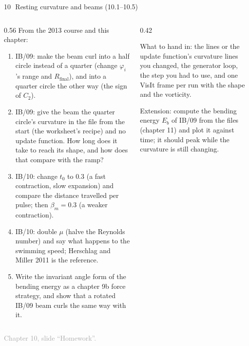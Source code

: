 \documentclass[aspectratio=169,11pt]{beamer}
\newcommand{\sourcecredit}[1]{\vfill\begin{flushright}\tiny\textcolor{DarkGray}{#1}\end{flushright}}
\begin{document}
\begin{frame}{10\,\textbullet\ Resting curvature and beams (10.1--10.5)}
\label{fr:c10x1}
\begin{columns}[T,onlytextwidth]
\begin{column}{0.56\textwidth}
\scriptsize From the 2013 course and this chapter:
\begin{enumerate}
  \item[10.1] IB/09: make the beam curl into a half circle instead of a quarter (change $\varphi_i$'s range and $R_{\mathrm{final}}$), and into a quarter circle the other way (the sign of $C_2$).
  \item[10.2] IB/09: give the beam the quarter circle's curvature in the  file from the start (the worksheet's recipe) and no update function. How long does it take to reach its shape, and how does that compare with the ramp?
  \item[10.3] IB/10: change $t_0$ to $0.3$ (a fast contraction, slow expansion) and compare the distance travelled per pulse; then $\beta_m = 0.3$ (a weaker contraction).
  \item[10.4] IB/10: double $\mu$ (halve the Reynolds number) and say what happens to the swimming speed; Herschlag and Miller 2011 is the reference.
  \item[10.5] Write the invariant angle form of the bending energy as a chapter 9b force strategy, and show that a rotated IB/09 beam curls the same way with it.
\end{enumerate}
\end{column}
\begin{column}{0.42\textwidth}
\begin{punchbox}
\scriptsize What to hand in: the  lines or the update function's curvature lines you changed, the generator loop, the step you had to use, and one VisIt frame per run with the shape and the vorticity.
\end{punchbox}
\scriptsize {} Extension: compute the bending energy $E_b$ of IB/09 from the  files (chapter 11) and plot it against time; it should peak while the curvature is still changing.
\end{column}
\end{columns}
\sourcecredit{Chapter 10, slide ``Homework''.}
\end{frame}
\end{document}
